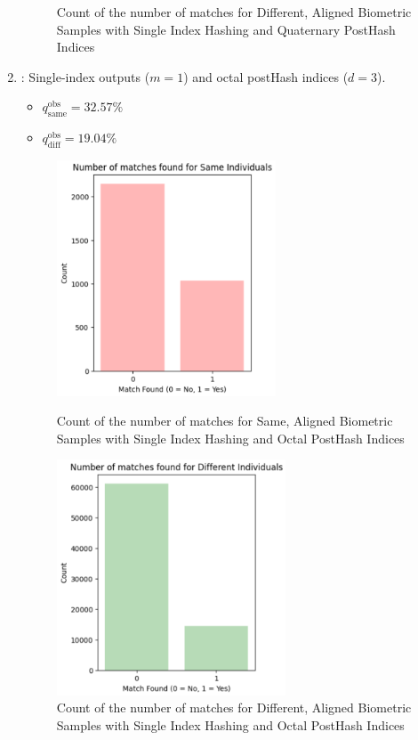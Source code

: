 \begin{enumerate}
\begin{figure}[H]
\begin{minipage}[b]{0.48\linewidth}
            \caption{Count of the number of matches for Different, Aligned Biometric Samples with Single Index Hashing and Quaternary PostHash Indices}
            \label{mu_diff}
        \end{minipage}
    \end{figure}
    \newpage
    \item {}: Single-index outputs (\(m=1\)) and octal postHash indices (\(d=3\)).
    \begin{itemize}
        \item \(q_{\text{same}}^{\text{obs}} = 32.57\%\)
        \item \(q_{\text{diff}}^{\text{obs}} = 19.04\%\)
    \end{itemize}

    \begin{figure}[H]
        \centering
        \begin{minipage}[b]{0.48\linewidth}
            \centering
            \includegraphics[width=\linewidth,height=7cm,keepaspectratio]{latex-img/d3same.png}
            \caption{Count of the number of matches for Same, Aligned Biometric Samples with Single Index Hashing and Octal PostHash Indices}
            \label{mu_same}
        \end{minipage}
        \hfill
        \begin{minipage}[b]{0.48\linewidth}
            \centering
            \includegraphics[width=\linewidth,height=7cm,keepaspectratio]{latex-img/d3diff.png}
            \caption{Count of the number of matches for Different, Aligned Biometric Samples with Single Index Hashing and Octal PostHash Indices}
            \label{mu_diff}
        \end{minipage}
    \end{figure}
    

\end{enumerate}
